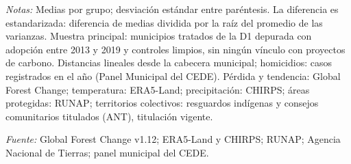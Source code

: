\begin{table}[htbp]
\begin{threeparttable}
\begin{tablenotes}[flushleft]
\footnotesize
\item \textit{Notas:} Medias por grupo; desviación estándar entre paréntesis. La diferencia es estandarizada: diferencia de medias dividida por la raíz del promedio de las varianzas. Muestra principal: municipios tratados de la D1 depurada con adopción entre 2013 y 2019 y controles limpios, sin ningún vínculo con proyectos de carbono. Distancias lineales desde la cabecera municipal; homicidios: casos registrados en el año (Panel Municipal del CEDE). Pérdida y tendencia: Global Forest Change; temperatura: ERA5-Land; precipitación: CHIRPS; áreas protegidas: RUNAP; territorios colectivos: resguardos indígenas y consejos comunitarios titulados (ANT), titulación vigente.
\item \textit{Fuente:} Global Forest Change v1.12; ERA5-Land y CHIRPS; RUNAP; Agencia Nacional de Tierras; panel municipal del CEDE.
\end{tablenotes}
\end{threeparttable}
\end{table}
